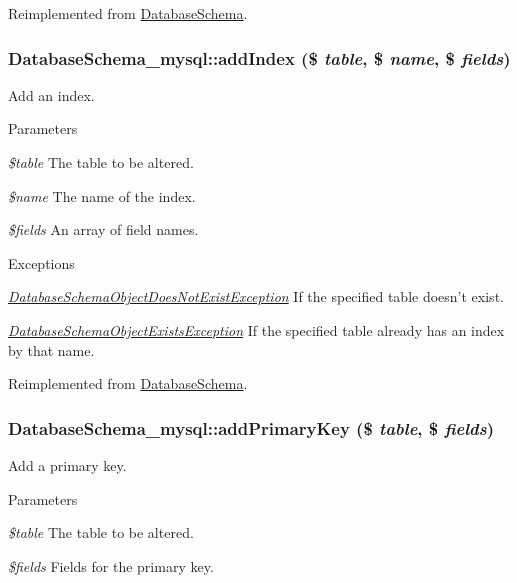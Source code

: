 Reimplemented from \hyperlink{classDatabaseSchema_a54800af6c4094cea196e1c66b5106c99}{DatabaseSchema}.\hypertarget{classDatabaseSchema__mysql_a18bb0f395ccfb5bab5385485d1b8b12a}{
\subsubsection[{addIndex}]{\setlength{\rightskip}{0pt plus 5cm}DatabaseSchema\_\-mysql::addIndex (\$ {\em table}, \/  \$ {\em name}, \/  \$ {\em fields})}}
\label{classDatabaseSchema__mysql_a18bb0f395ccfb5bab5385485d1b8b12a}
Add an index.


\begin{DoxyParams}{Parameters}
\item[{\em \$table}]The table to be altered. \item[{\em \$name}]The name of the index. \item[{\em \$fields}]An array of field names.\end{DoxyParams}

\begin{DoxyExceptions}{Exceptions}
\item[{\em \hyperlink{classDatabaseSchemaObjectDoesNotExistException}{DatabaseSchemaObjectDoesNotExistException}}]If the specified table doesn't exist. \item[{\em \hyperlink{classDatabaseSchemaObjectExistsException}{DatabaseSchemaObjectExistsException}}]If the specified table already has an index by that name. \end{DoxyExceptions}


Reimplemented from \hyperlink{classDatabaseSchema_a12f4b519abe55aaef3e4d736dbb27ab7}{DatabaseSchema}.\hypertarget{classDatabaseSchema__mysql_af133b10cf19353fef894d1a0550f7b2b}{
\subsubsection[{addPrimaryKey}]{\setlength{\rightskip}{0pt plus 5cm}DatabaseSchema\_\-mysql::addPrimaryKey (\$ {\em table}, \/  \$ {\em fields})}}
\label{classDatabaseSchema__mysql_af133b10cf19353fef894d1a0550f7b2b}
Add a primary key.


\begin{DoxyParams}{Parameters}
\item[{\em \$table}]The table to be altered. \item[{\em \$fields}]Fields for the primary key.\end{DoxyParams}


